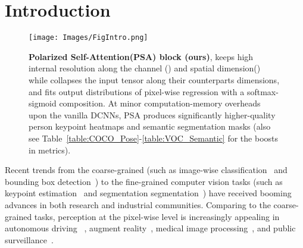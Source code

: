 \documentclass[10pt,twocolumn,letterpaper]{article}
\begin{document}
\section{Introduction}
\begin{figure}[!htb]
\centering
\texttt{[image: Images/FigIntro.png]}
\caption{\textbf{Polarized Self-Attention(PSA) block (ours)}, keeps high internal resolution along the channel () and spatial dimension() while collapses the input tensor  along their counterparts dimensions, and fits output distributions of pixel-wise regression with a softmax-sigmoid composition. At minor computation-memory overheads upon the vanilla DCNNs, PSA produces significantly higher-quality person keypoint heatmaps and semantic segmentation masks (also see Table~\ref{table:COCO_Pose}-\ref{table:VOC_Semantic} for the boosts in metrics). }
  \label{fig:Intro}
\end{figure}
Recent trends from the coarse-grained (such as image-wise classification~\cite{Russakovsky15ImageNet} and bounding box detection~\cite{Girshick15FastR-CNN}) to the fine-grained computer vision tasks (such as keypoint estimation~\cite{Luo21} and segmentation segmentation~\cite{Zhong20}) have received booming advances in both research and industrial communities. Comparing to the coarse-grained tasks, perception at the pixel-wise level is increasingly appealing in autonomous driving ~\cite{Treml16}, augment reality~\cite{Chiu18}, medical image processing~\cite{Litjens17}, and public surveillance~\cite{Wang21}. 
\end{document}
